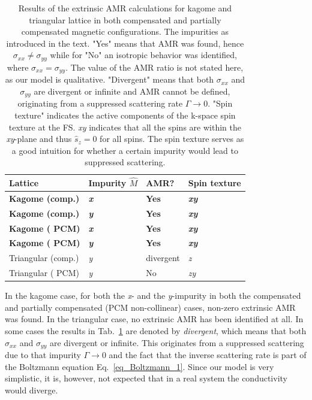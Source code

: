 \documentclass[prb,showpacs,amsmath,amssymb,superscriptaddress,twocolumn,floatfix]{revtex4-1}
\begin{document}
\begin{table}
	\begin{tabular}{llll}
		Lattice & Impurity $\hat{M}$ & AMR? & Spin texture \\
		\hline 
		\textbf{Kagome (comp.)} & \textbf{\textit{x}} & \textbf{Yes} & \textbf{\textit{xy}} \\
		\textbf{Kagome (comp.)} & \textbf{\textit{y}} & \textbf{Yes} & \textbf{\textit{xy}} \\
		\textbf{Kagome ({\color{blue} PCM})} & \textbf{\textit{x}} & \textbf{Yes} & \textbf{\textit{xy}} \\
		\textbf{Kagome ({\color{blue} PCM})} & \textbf{\textit{y}} & \textbf{Yes} & \textbf{\textit{xy}} \\
		\hline 
		Triangular (comp.) & \textit{y} & divergent & \textit{z} \\
		Triangular ({\color{blue} PCM}) & \textit{y} & No & \textit{zy} \\
	\end{tabular}
	\caption{Results of the extrinsic AMR calculations for kagome and triangular lattice in both compensated and partially compensated magnetic configurations. The impurities as introduced in the text. "Yes" means that AMR was found, hence $\sigma_{xx} \neq \sigma_{yy}$ while for "No" an isotropic behavior was identified, where $\sigma_{xx} = \sigma_{yy}$. The value of the AMR ratio is not stated here, as our model is qualitative. "Divergent" means that both $\sigma_{xx}$ and $\sigma_{yy}$ are divergent or infinite and AMR cannot be defined, originating from a suppressed scattering rate $\Gamma \rightarrow 0$. "Spin texture" indicates the active components of the k-space spin texture at the FS. \textit{xy} indicates that all the spins are within the \textit{xy}-plane and thus $\hat{s}_z = 0$ for all spins. The spin texture serves as a good intuition for whether a certain impurity would lead to suppressed scattering.}
	\label{T_extrinsic}
\end{table}


In the kagome case, for both the \textit{x}- and the \textit{y}-impurity in both the compensated and {\color{blue} partially compensated (PCM} non-collinear) cases, non-zero extrinsic AMR was found. In the triangular case, no extrinsic AMR has been identified at all. In some cases the results in Tab.~\ref{T_extrinsic} are denoted by \textit{divergent}, which means that both $\sigma_{xx}$ and $\sigma_{yy}$ are divergent or infinite. This originates from a suppressed scattering due to that impurity $\Gamma \rightarrow 0$ and the fact that the inverse scattering rate is part of the Boltzmann equation Eq.~\ref{eq_Boltzmann_1}. Since our model is very simplistic, it is, however, not expected that in a real system the conductivity would diverge.
\end{document}
